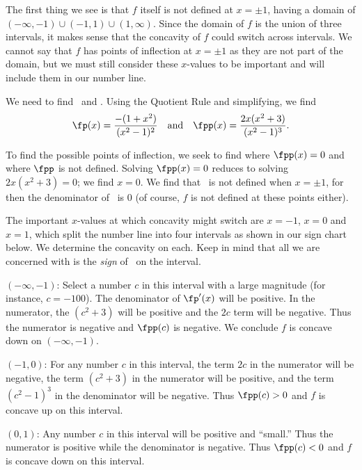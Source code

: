 {The first thing we see is that $f$ itself is not defined at $x=\pm1$, having a domain of $(-\infty,-1)\cup(-1,1)\cup(1,\infty)$. Since the domain of $f$ is the union of three intervals, it makes sense that the concavity of $f$ could switch across intervals. We cannot say that $f$ has points of inflection at $x=\pm1$ as they are not part of the domain, but we must still consider these $x$-values to be important and will include them in our number line.

We need to find \fp\ and \fpp. Using the Quotient Rule and simplifying, we find
$$\fp(x)=\frac{-(1+x^2)}{(x^2-1)^2} \quad \text{and}\quad \fpp(x) = \frac{2x(x^2+3)}{(x^2-1)^3}.$$

To find the possible points of inflection, we seek to find where $\fpp(x)=0$ and where $\fpp$ is not defined. Solving $\fpp(x)=0$ reduces to solving $2x(x^2+3)=0$; we find $x=0$.  We find that \fpp\ is not defined when $x=\pm 1$, for then the denominator of \fpp\ is 0 (of course, $f$ is not defined at these points either).

The important $x$-values at which concavity might switch are $x=-1$, $x=0$ and $x=1$, which  split the number line into four intervals as shown in our sign chart below. We determine the concavity on each. Keep in mind that all we are concerned with is the \textit{sign} of \fpp\ on the interval.\bigskip

\iflatexml\begin{description}\else\begin{description}[leftmargin=0pt]\fi
\item[Interval 1,] $(-\infty,-1)$: Select a number $c$ in this interval with a large magnitude (for instance, $c=-100$). The denominator of $\fp'(x)$ will be positive. In the numerator, the $(c^2+3)$ will be positive and the $2c$ term will be negative. Thus the numerator is negative and $\fpp(c)$ is negative. We conclude $f$ is concave down on $(-\infty,-1)$.

\item[Interval 2,] $(-1,0)$: For any number $c$ in this interval, the term $2c$ in the numerator will be negative, the term $(c^2+3)$ in the numerator will be positive, and the term $(c^2-1)^3$ in the denominator will be negative. Thus $\fpp(c)>0$ and $f$ is concave up on this interval.

\item[Interval 3,] $(0,1)$: Any number $c$ in this interval will be positive and ``small.'' Thus the numerator is positive while the denominator is negative. Thus $\fpp(c)<0$ and $f$ is concave down on this interval.


\end{description}
\end{description}}
